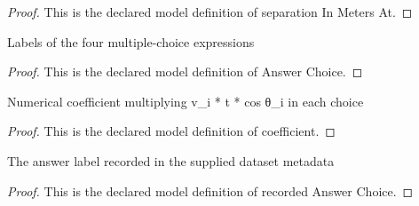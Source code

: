 \begin{proof}
  This is the declared model definition of separation In Meters At.
\end{proof}
\begin{definition}
  \label{def:physics:phyx-mini-0691:phyxminiproblems-problemphyxmini0691-answerchoice}
  Labels of the four multiple-choice expressions
\end{definition}
\begin{proof}
  This is the declared model definition of Answer Choice.
\end{proof}
\begin{definition}[coefficient]
  \label{def:physics:phyx-mini-0691:phyxminiproblems-problemphyxmini0691-answerchoice-coefficient}
  Numerical coefficient multiplying v\_i * t * cos θ\_i in each choice
\end{definition}
\begin{proof}
  This is the declared model definition of coefficient.
\end{proof}
\begin{definition}
  \label{def:physics:phyx-mini-0691:phyxminiproblems-problemphyxmini0691-recordedanswerchoice}
  The answer label recorded in the supplied dataset metadata
\end{definition}
\begin{proof}
  This is the declared model definition of recorded Answer Choice.
\end{proof}
